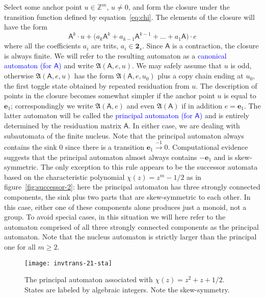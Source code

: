 \documentclass[12pt]{svmult}
\def\emph#1{\textcolor{blue}{#1}}
\def\2{\mathbf{2}}
\def\Z{\mathbb{Z}}
\def\AA{\mathsf{A}}             %
\def\fA{\mathfrak{A}}
\def\trans#1#2#3{{#1}\stackrel{{#2}}{\longrightarrow}{#3}}
\def\tsym{\2_{s}}               %
\def\unvo{\mathbf{e}_{1}}
\begin{document}
Select some anchor point $u \in \Z^{m}$, $u \neq 0$, and form the closure under the 
transition function defined by equation~\eqref{eq:chi}.
The elements of the closure will have the form 
%
\begin{equation}
\label{eq:closure}
    \AA^{k} \cdot u + \bigl( a_{k} \AA^{k} + a_{k-1} \AA^{k-1} + \ldots + a_{1} \AA \bigr) \cdot e
\end{equation}
%
where all the coefficients $a_i$ are trits, $a_{i} \in \tsym$. 
Since $\AA$ is a contraction, the closure is always finite. 
We will refer to the resulting automaton as a \emph{canonical automaton (for $\AA$)}
and write $\fA(\AA,e,u)$. 
We may safely assume that $u$ is odd, otherwise $\fA(\AA,e,u)$ has the form 
$\fA(\AA,e,u_{0})$ plus a copy chain ending at $u_0$, the first toggle state obtained by 
repeated residuation from $u$. 
The description of points in the closure becomes somewhat simpler if the anchor point $u$ is 
equal to $\unvo$; correspondingly we write $\fA(\AA,e)$ and even $\fA(\AA)$ if in addition $e = \unvo$. 
The latter automaton will be called the \emph{principal automaton (for $\AA$)} and is 
entirely determined by the residuation matrix $\AA$. 
In either case, we are dealing with subautomata of the finite nucleus. 
Note that the principal automaton always contains the sink $0$ since there is a 
transition $\trans{\unvo}{-1}{0}$. 
Computational evidence suggests that the principal automaton almost always contains 
$-\unvo$ and is skew-symmetric. 
The only exception to this rule appears to be the successor automata based on 
the characteristic polynomial $\chi(z) = z^{m} - 1/2$ as in figure~\ref{fig:successor-2}:
here the principal automaton has three strongly connected components, the sink plus two 
parts that are skew-symmetric to each other.  
In this case, either one of these components alone produces just a monoid, not a group. 
To avoid special cases, in this situation we will here refer to the automaton comprised 
of all three strongly connected components as the principal automaton. 
Note that the nucleus automaton is strictly larger than the principal one for all 
$m \geq 2$. 

\begin{figure}[t]
  \centering
  \texttt{[image: invtrans-21-sta]}
  \caption{The principal automaton associated with $\chi(z) = z^{2} + z + 1/2$. 
    States are labeled by algebraic integers. Note the skew-symmetry.}
  \label{fig:principal-2lat}
\end{figure}
\end{document}
